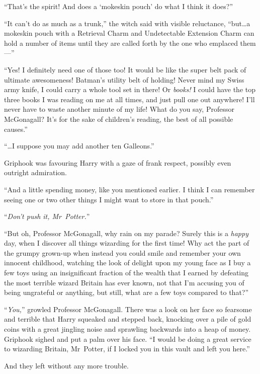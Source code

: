 “That’s the spirit! And does a ‘mokeskin pouch’ do what I think it does?”

“It can’t do as much as a trunk,” the witch said with visible reluctance, “but…a mokeskin pouch with a Retrieval Charm and Undetectable Extension Charm can hold a number of items until they are called forth by the one who emplaced them---”

“Yes! I definitely need one of those too! It would be like the super belt pack of ultimate awesomeness! Batman’s utility belt of holding! Never mind my Swiss army knife, I could carry a whole tool set in there! Or \emph{books!} I could have the top three books I was reading on me at all times, and just pull one out anywhere! I’ll never have to waste another minute of my life! What do you say, Professor McGonagall? It’s for the sake of children’s reading, the best of all possible causes.”

“…I suppose you may add another ten Galleons.”

Griphook was favouring Harry with a gaze of frank respect, possibly even outright admiration.

“And a little spending money, like you mentioned earlier. I think I can remember seeing one or two other things I might want to store in that pouch.”

“\emph{Don’t push it, Mr~Potter.}”

“But oh, Professor McGonagall, why rain on my parade? Surely this is a \emph{happy} day, when I discover all things wizarding for the first time! Why act the part of the grumpy grown-up when instead you could smile and remember your own innocent childhood, watching the look of delight upon my young face as I buy a few toys using an insignificant fraction of the wealth that I earned by defeating the most terrible wizard Britain has ever known, not that I’m accusing you of being ungrateful or anything, but still, what are a few toys compared to that?”

“\emph{You,}” growled Professor McGonagall. There was a look on her face so fearsome and terrible that Harry squeaked and stepped back, knocking over a pile of gold coins with a great jingling noise and sprawling backwards into a heap of money. Griphook sighed and put a palm over his face. “I would be doing a great service to wizarding Britain, Mr~Potter, if I locked you in this vault and left you here.”

And they left without any more trouble.

